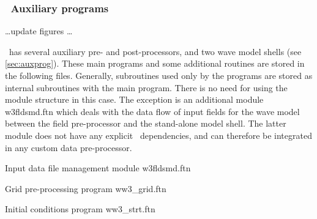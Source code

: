 \vsssub
\subsubsection{~Auxiliary programs} \label{sec:aux_mod}
\vsssub

\centerline{\ldots update figures \ldots}
\vspace{\baselineskip}
\noindent
\ww\ has several auxiliary pre- and post-processors, and two wave model shells
(see \para\ref{sec:auxprog}). These main programs and some additional routines
are stored in the following files. Generally, subroutines used only by the
programs are stored as internal subroutines with the main program. There is no
need for using the module structure in this case. The exception is an
additional module {\file w3fldsmd.ftn} which deals with the data flow of input
fields for the wave model between the field pre-processor and the stand-alone
model shell. The latter module does not have any explicit \ws\ dependencies,
and can therefore be integrated in any custom data pre-processor.




\vspace{\baselineskip} 
\noindent
Input data file management module \hfill {\file w3fldsmd.ftn}

\begin{flisti}
\end{flisti}

\noindent
Grid pre-processing program \hfill {\file ww3\_grid.ftn}

\begin{flisti}
\end{flisti}

\noindent
Initial conditions program \hfill {\file ww3\_strt.ftn}

\begin{flisti}
\end{flisti}


